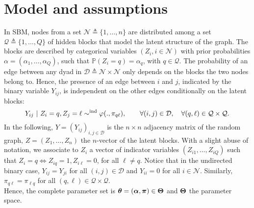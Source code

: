 \documentclass[]{imsart}
\newcommand{\1}{\mathds{1}}
\newcommand{\MA}{Y}
\newcommand{\block}{\mathcal{Q}}
\newcommand{\dyad}{\mathcal{D}}
\newcommand{\node}{\mathcal{N}}
\newcommand{\Pbb}{\mathbb{P}}
\numberwithin{equation}{section}
\theoremstyle{plain}
\theoremstyle{remark}
\begin{document}
\section{Model and assumptions}

In  SBM,  nodes  from  a  set  $\node  \triangleq  \{1,\dots,n\}$  are
distributed among a set $\block  \triangleq \{1, \dots, Q\}$ of hidden
blocks that  model the latent structure  of the graph. The  blocks are
described  by  categorical  variables $(Z_i,  i\in\node)$  with  prior
probabilities $\alpha  = ( \alpha_{1}, \dots,  \alpha_{Q})$, such that
$\Pbb(Z_i = q) = \alpha_q$,  with $q\in\block$.  
The probability of an edge between any dyad in
$\dyad \triangleq \node \times \node$ only depends on the blocks the
two nodes belong to.  Hence, the presence of an edge between $i$ and
$j$, indicated by the binary variable $Y_{ij}$, is independent on the
other edges conditionally on the latent blocks:
\begin{equation}
\nonumber
\MA_{ij}    \   |    \   Z_i=q,    Z_j   =    \ell   \sim^{\text{ind}}
\dens(., \pi_{q\el}), \qquad \forall (i,j) \in\dyad, \quad \forall
(q,\ell) \in\block\times\block.
\end{equation}
In the
following,
$Y=(Y_{ij})_{i,j\in\dyad}$ is
the $n\times n$ adjacency matrix of the random graph,
$Z = (Z_1, \dots, Z_n)$ the $n$-vector of the latent blocks.  With a slight abuse of notation, we associate to $Z_i$ a vector
of indicator variables $(Z_{i1}, \dots, Z_{iQ})$ such that
$Z_i = q \Leftrightarrow Z_{iq} = 1, Z_{i\ell} = 0$, for all
$\ell \neq q$.  Notice that in the undirected binary case,
$Y_{ij} = Y_{ji}$ for all $(i,j) \in \dyad$ and $Y_{ii} = 0$ for all
$i\in\node$.  Similarly, $\pi_{q\ell}=\pi_{\ell q}$ for all
$(q,\ell)\in\mathcal{Q}\times \mathcal{Q}$. \\

Hence, the  complete parameter set is $\boldsymbol{\theta}=(\boldsymbol{\alpha},\boldsymbol{\pi})\in\boldsymbol{\Theta}$ and  $\boldsymbol{\Theta}$  the parameter space.  

% 
\end{document}
